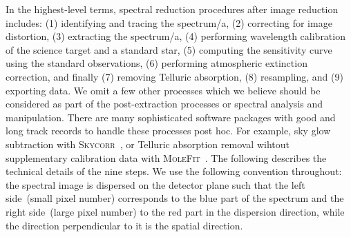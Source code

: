 \documentclass[linenumbers, twocolumn]{aastex631}
\begin{document}
In the highest-level terms, spectral reduction procedures after image reduction
includes: (1) identifying and tracing the spectrum/a, (2) correcting for image
distortion, (3) extracting the spectrum/a, (4) performing wavelength
calibration of the science target and a standard star, (5) computing the
sensitivity curve using the standard observations, (6) performing atmospheric
extinction correction, and finally (7) removing Telluric absorption,
(8) resampling, and (9) exporting data. We omit a few other processes which we
believe should be considered as part of the post-extraction processes or
spectral analysis and manipulation. There are many sophisticated software
packages with good and long track records to handle these processes post hoc.
For example, sky glow subtraction with
\textsc{Skycorr}~\citep{2014A&A...567A..25N}, or Telluric
absorption removal wihtout supplementary calibration data with
\textsc{MoleFit}~\citep{2015A&A...576A..77S, 2015A&A...576A..78K}.
The following describes the technical details of the nine steps. We use the
following convention throughout: the spectral image is dispersed on the detector
plane such that the left side~(small pixel number) corresponds to the blue part
of the spectrum and the right side~(large pixel number) to the red part in the
dispersion direction, while the direction perpendicular to it is the spatial
direction.

\end{document}

